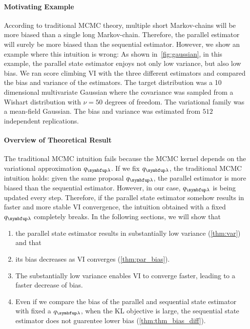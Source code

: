 \paragraph{Motivating Example}
According to traditional MCMC theory, multiple short Markov-chains will be more biased than a single long Markov-chain.
Therefore, the parallel estimator will surely be more biased than the sequential estimator.
However, we show an example where this intuition is wrong: As shown in~\cref{fig:gaussian}, in this example, the parallel state estimator enjoys not only low variance, but also low bias.
We ran score climbing VI with the three different estimators and compared the bias and variance of the estimators.
The target distribution was a 10 dimensional multivariate Gaussian where the covariance was sampled from a Wishart distribution with \(\nu = 50\) degrees of freedom.
The variational family was a mean-field Gaussian.
The bias and variance was estimated from \(512\) independent replications.

\vspace{-0.05in}
\paragraph{Overview of Theoretical Result}
The traditional MCMC intuition fails because the MCMC kernel depends on the variational approximation \(q_{\vlambda}\).
If we fix \(q_{\vlambda}\), the traditional MCMC intuition holds: given the same proposal \(q_{\vlambda}\), the parallel estimator is more biased than the sequential estimator.
However, in our case, \(q_{\vlambda}\) is being updated every step.
Therefore, if the parallel state estimator somehow results in faster and more stable VI convergence, the intuition obtained with a fixed \(q_{\vlambda}\) completely breaks.
In the following sections, we will show that 
\vspace{-0.05in}
\begin{enumerate}[noitemsep]
  \item[\ding{182}] the parallel state estimator results in substantially low variance (\cref{thm:var}) and that
  \item[\ding{183}] its bias decreases as VI converges (\cref{thm:par_bias}).
  \item[\ding{184}] The substantially low variance enables VI to converge faster, leading to a faster decrease of bias.
  \item[\ding{185}] Even if we compare the bias of the parallel and sequential state estimator with fixed a \(q_{\vlambda}\), when the KL objective is large, the sequential state estimator does not guarentee lower bias (\cref{thm:thm_bias_diff}).
\end{enumerate}
\vspace{-0.05in}

